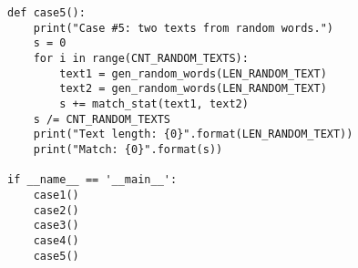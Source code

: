 \documentclass[a4paper,12pt]{article}
\begin{document}
\begin{lstlisting}
def case5():
    print("Case #5: two texts from random words.")
    s = 0
    for i in range(CNT_RANDOM_TEXTS):
        text1 = gen_random_words(LEN_RANDOM_TEXT)
        text2 = gen_random_words(LEN_RANDOM_TEXT)
        s += match_stat(text1, text2)
    s /= CNT_RANDOM_TEXTS
    print("Text length: {0}".format(LEN_RANDOM_TEXT))
    print("Match: {0}".format(s))

if __name__ == '__main__':
    case1()
    case2()
    case3()
    case4()
    case5()
\end{lstlisting}
\end{document}

